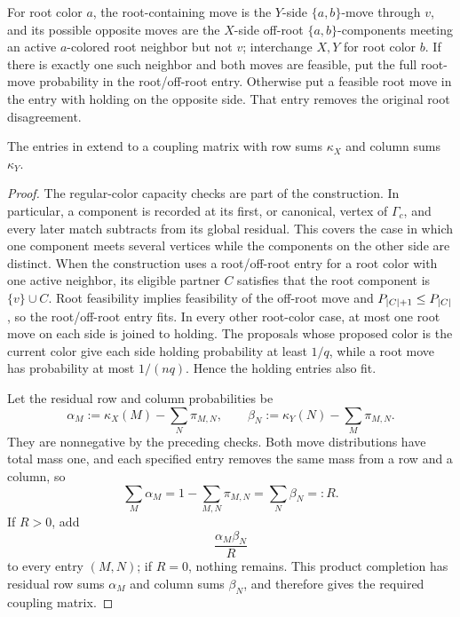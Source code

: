 \begin{definition}
For root color \(a\), the root-containing move is the \(Y\)-side
\(\{a,b\}\)-move through \(v\), and its possible opposite moves are the
\(X\)-side off-root \(\{a,b\}\)-components meeting an active
\(a\)-colored root neighbor but not \(v\); interchange \(X,Y\) for
root color \(b\).  If there is exactly one such neighbor and both moves
are feasible, put the full root-move probability in the root/off-root
entry.  Otherwise put a feasible root move in the entry with holding on the
opposite side.  That entry removes the original root disagreement.
\end{definition}

\begin{lemma}
\label{lem:cv-completion}
The entries in  extend to a coupling matrix
with row sums \(\kappa_X\) and column sums \(\kappa_Y\).
\end{lemma}

\begin{proof}
The regular-color capacity checks are part of the construction.  In
particular, a component is recorded at its first, or canonical, vertex of
\(\Gamma_c\), and every later match subtracts from its global residual.
This covers the case in which one component meets several vertices while
the components on the other side are distinct.  When the construction uses
a root/off-root entry for a root color with one active neighbor, its
eligible partner \(C\) satisfies that the root component is
\(\{v\}\cup C\).  Root feasibility implies feasibility of the
off-root move and \(P_{\left|C\right|+1}\le P_{\left|C\right|}\), so the root/off-root
entry fits.  In every other root-color case, at most one root move on each
side is joined to holding.  The proposals whose proposed color is the
current color give each side holding probability at least \(1/q\), while
a root move has probability at most \(1/(nq)\).  Hence the holding entries
also fit.

Let the residual row and column probabilities be
\begin{equation}\label{eq:cv-residual-masses}
  \alpha_M:=\kappa_X(M)-\sum_N\pi_{M,N},
  \qquad
  \beta_N:=\kappa_Y(N)-\sum_M\pi_{M,N}.
\end{equation}
They are nonnegative by the preceding checks.  Both move distributions
have total mass one, and each specified entry removes the same mass from a
row and a column, so
\[
  \sum_M\alpha_M
  =1-\sum_{M,N}\pi_{M,N}
  =\sum_N\beta_N
  =:R.
\]
If \(R>0\), add
\[
  \frac{\alpha_M\beta_N}{R}
\]
to every entry \((M,N)\); if \(R=0\), nothing remains.  This product
completion has residual row sums \(\alpha_M\) and column sums
\(\beta_N\), and therefore gives the required coupling matrix.
\end{proof}

